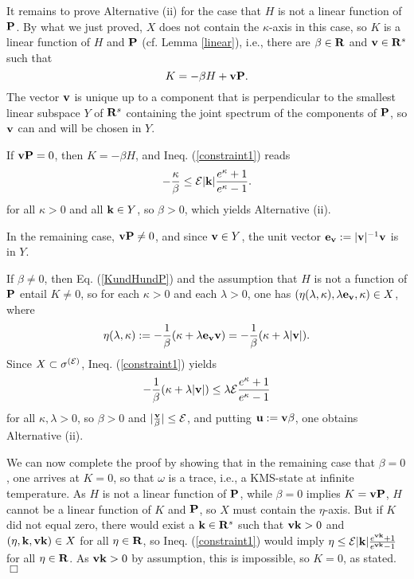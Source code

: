 \documentclass[a4paper,11pt]{article}
\def\E{{\cal E}}
\def\go{\omega}
\def\Halmos{\quad\hfill$\Box$}
\def\impuls{k}
\def\reals{{\bf R}}
\begin{document}
It remains to prove Alternative (ii) for the case that
$H$ is not a linear function of ${\bf P}$.
By what we just proved, $X$ does not contain the $\kappa$-axis in this case,
so $K$ is a linear function of $H$ and ${\bf P}$ (cf. Lemma \ref{linear}),
i.e., there are $\beta\in\reals$ and ${\bf v}\in\reals^s$ such that
\begin{equation}\label{KundHundP}
K=-\beta H+{\bf v}{\bf P}.
\end{equation}
The vector ${\bf v}$ is unique up to a component that is perpendicular
to the smallest linear subspace $Y$ of $\reals^s$
containing the joint spectrum of the components of ${\bf P}$, so
${\bf v}$ can and will be chosen in $Y$.

If ${\bf vP}=0$, then
$K=-\beta H$, and Ineq. (\ref{constraint1}) reads
$$-\frac{\kappa}{\beta}\leq\E|{\bf k}|\frac{e^\kappa+1}{e^\kappa-1}.$$
for all $\kappa>0$ and all ${\bf k}\in Y$, so
$\beta>0$, which yields Alternative (ii).

In the remaining case, ${\bf vP}\not=0$, and since ${\bf v}\in Y$,
the unit vector ${\bf e_v}:=|{\bf v}|^{-1}{\bf v}$ is in $Y$.

If $\beta\not=0$, then Eq. (\ref{KundHundP}) and
the assumption that $H$ is not a function of ${\bf P}$ entail $K\not=0$,
so for each $\kappa>0$ and each $\lambda>0$,
one has $(\eta(\lambda,\kappa),\lambda{\bf e_v},\kappa)\in X$,
where
$$\eta(\lambda,\kappa)
:=-\frac{1}{\beta}(\kappa+\lambda {\bf e_v}{\bf v})
 =-\frac{1}{\beta}(\kappa+\lambda|{\bf v}|).$$
Since $X\subset\sigma^{(\E)}$, Ineq. (\ref{constraint1}) yields
$$-\frac{1}{\beta}(\kappa+
\lambda|{\bf v}|)\leq\lambda\E\frac{e^\kappa+1}{e^\kappa-1}$$
for all $\kappa,\lambda>0$, so $\beta>0$ and $|\frac{{\bf v}}{\beta}|\leq\E$,
and putting ${\bf u}:={\bf v}{\beta}$, one obtains Alternative (ii).

We can now complete the proof by showing that in the remaining case 
that $\beta=0$, one arrives at $K=0$, so that 
$\go$ is a trace, i.e., a KMS-state at infinite temperature.
As $H$ is not a linear function of ${\bf P}$, while $\beta=0$ implies
$K={\bf vP}$, $H$ cannot be a linear function of $K$ and ${\bf P}$, so
$X$ must contain the $\eta$-axis. But if
$K$ did not equal zero, there would exist a ${\bf k}\in\reals^s$ such that
${\bf vk}>0$ and $(\eta,{\bf k},{\bf vk})\in X$
for all $\eta\in\reals$, so Ineq. (\ref{constraint1}) would imply
$\eta\leq\E|{\bf\impuls}|
\frac{e^{{\bf v}{\bf k}}+1}{e^{{\bf v}{\bf k}}-1}$
for all $\eta\in\reals$.
As ${\bf vk}>0$ by assumption, this is impossible, so $K=0$, as
stated.
\Halmos
\end{document}
